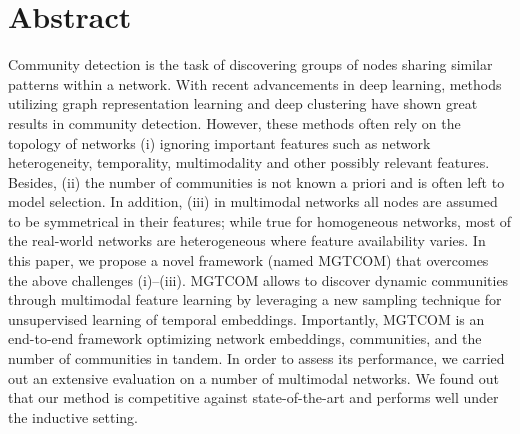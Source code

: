 
\chapter*{Abstract}
Community detection is the task of discovering groups of nodes sharing similar patterns within a network.
With recent advancements in deep learning, methods utilizing graph representation learning and deep clustering have shown great results in community detection.
However, these methods often rely on the topology of networks (i) ignoring important features such as network heterogeneity, temporality, multimodality and other possibly relevant features.
Besides, (ii) the number of communities is not known a priori and is often left to model selection.
In addition, (iii) in multimodal networks all nodes are assumed to be symmetrical in their features; while true for homogeneous networks, most of the real-world networks are heterogeneous where feature availability varies.
In this paper, we propose a novel framework (named MGTCOM) that overcomes the above challenges (i)--(iii). MGTCOM allows to discover dynamic communities through multimodal feature learning by leveraging a new sampling technique for unsupervised learning of temporal embeddings. Importantly, MGTCOM is an end-to-end framework optimizing network embeddings, communities, and the number of communities in tandem.
In order to assess its performance, we carried out an extensive evaluation on a number of multimodal networks.
We found out that our method is competitive against state-of-the-art and performs well under the inductive setting.